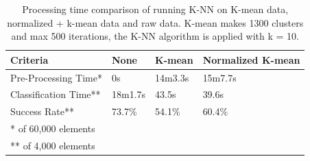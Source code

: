 \begin{table}[H]
\centering


\begin{tabular}{|l|p{2cm}|p{2cm}|p{2cm}|}\hline
Criteria              & None   & K-mean & Normalized K-mean \\ \hline
Pre-Processing Time*  & 0s     & 14m3.3s & 15m7.7s            \\ \hline
Classification Time** & 18m1.7s & 43.5s  & 39.6s             \\ \hline
Success Rate**        & 73.7\% & 54.1\% & 60.4\%            \\ \hline
\multicolumn{4}{|l|}{* of 60,000 elements} \\ 
\multicolumn{4}{|l|}{** of 4,000 elements} \\ \hline
\end{tabular}
\caption{Processing time comparison of running K-NN on K-mean data, normalized + k-mean data and raw data. K-mean makes 1300 clusters and max 500 iterations, the K-NN algorithm is applied with k = 10.}
\label{tab:processingtime_kmean_vs_raw_knn}
\end{table}